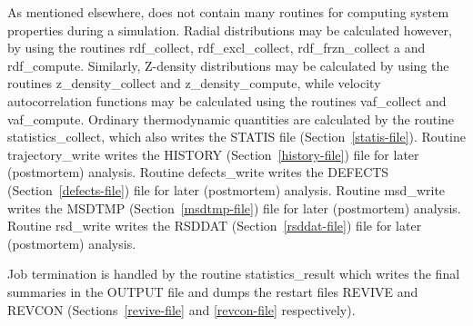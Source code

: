 As mentioned elsewhere, \D does not contain many routines for
computing system properties during a simulation.  Radial
distributions may be calculated however, by using the routines
{\sc rdf\_collect}, {\sc rdf\_excl\_collect},
{\sc rdf\_frzn\_collect} a and {\sc rdf\_compute}.
Similarly, Z-density distributions may be calculated by using the
routines {\sc z\_density\_collect} and {\sc z\_density\_compute}, 
while velocity autocorrelation functions may be calculated using 
the routines {\sc vaf\_collect} and {\sc vaf\_compute}. 
Ordinary thermodynamic quantities are calculated by the routine
{\sc statistics\_collect}, which also writes the STATIS file
(Section~\ref{statis-file}).  Routine {\sc trajectory\_write} writes the
HISTORY (Section~\ref{history-file}) file for later (postmortem)
analysis.  Routine {\sc defects\_write} writes the DEFECTS
(Section~\ref{defects-file}) file for later (postmortem) analysis.
Routine {\sc msd\_write} writes the MSDTMP (Section~\ref{msdtmp-file})
file for later (postmortem) analysis.  Routine {\sc rsd\_write}
writes the RSDDAT (Section~\ref{rsddat-file}) file for later
(postmortem) analysis.

Job termination is handled by the routine {\sc statistics\_result}
which writes the final summaries in the OUTPUT file and dumps the
restart files REVIVE and REVCON (Sections~\ref{revive-file} and
\ref{revcon-file} respectively).
